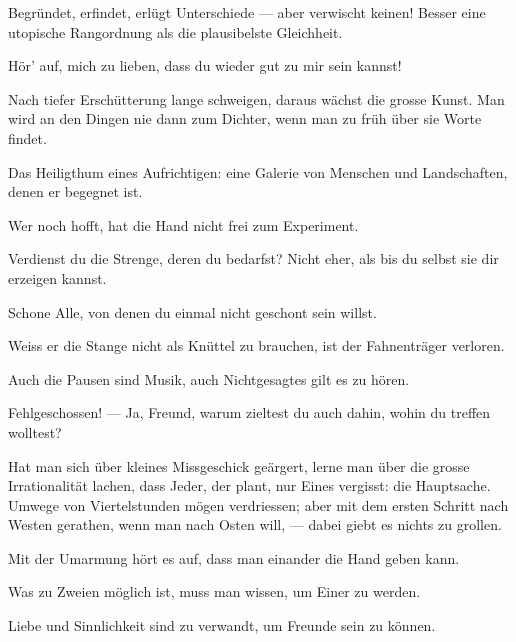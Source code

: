 Begründet, erfindet, erlügt Unterschiede — aber verwischt keinen! Besser eine utopische Rangordnung als die plausibelste Gleichheit.
\par

Hör’ auf, mich zu lieben, dass du wieder gut zu mir sein kannst!
\par

Nach tiefer Erschütterung lange schweigen, daraus wächst die grosse Kunst. Man wird an den Dingen nie dann zum Dichter, wenn man zu früh über sie Worte findet.
\par

Das Heiligthum eines Aufrichtigen: eine Galerie von Menschen und Landschaften, denen er  begegnet ist.
\par

Wer noch hofft, hat die Hand nicht frei zum Experiment.
\par

Verdienst du die Strenge, deren du bedarfst? Nicht eher, als bis du selbst sie dir erzeigen kannst.
\par

Schone Alle, von denen du einmal nicht geschont sein willst.
\par

Weiss er die Stange nicht als Knüttel zu brauchen, ist der Fahnenträger verloren.
\par

Auch die Pausen sind Musik, auch Nichtgesagtes gilt es zu hören.
\par

Fehlgeschossen! — Ja, Freund, warum zieltest du auch dahin, wohin du treffen wolltest?
\par

Hat man sich über kleines Missgeschick geärgert, lerne man über die grosse Irrationalität lachen, dass Jeder, der plant, nur Eines vergisst: die Hauptsache. Umwege von Viertelstunden mögen verdriessen; aber mit dem ersten Schritt nach Westen gerathen, wenn man nach Osten will, — dabei giebt es nichts zu grollen.
\par

Mit der Umarmung hört es auf, dass man einander die Hand geben kann.
\par

Was zu Zweien möglich ist, muss man wissen, um Einer zu werden.
\par

Liebe und Sinnlichkeit sind zu verwandt, um Freunde sein zu können.
\par

